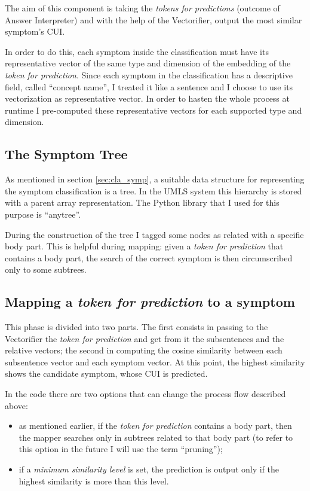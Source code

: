 The aim of this component is taking the \textit{tokens for predictions} (outcome of Answer Interpreter) and with the help of the Vectorifier, output the most similar symptom's CUI.

In order to do this, each symptom inside the classification must have its representative vector of the same type and dimension of the embedding of the \textit{token for prediction}. Since each symptom in the classification has a descriptive field, called ``concept name'', I treated it like a sentence and I choose to use its vectorization as representative vector. In order to hasten the whole process at runtime I pre-computed these representative vectors for each supported type and dimension.

\subsection{The Symptom Tree}
As mentioned in section \ref{sec:cla_symp}, a suitable data structure for representing the symptom classification is a tree. In the UMLS system this hierarchy is stored with a parent array representation. The Python library that I used for this purpose is ``anytree''.

During the construction of the tree I tagged some nodes as related with a specific body part. This is helpful during mapping: given a \textit{token for prediction} that contains a body part, the search of the correct symptom is then circumscribed only to some subtrees.

\subsection{Mapping a \textit{token for prediction} to a symptom}
This phase is divided into two parts. The first consists in passing to the Vectorifier the \textit{token for prediction} and get from it the subsentences and the relative vectors; the second in computing the cosine similarity between each subsentence vector and each symptom vector. At this point, the highest similarity shows the candidate symptom, whose CUI is predicted.

In the code there are two options that can change the process flow described above:
\begin{itemize}
  \item as mentioned earlier, if the \textit{token for prediction} contains a body part, then the mapper searches only in subtrees related to that body part (to refer to this option in the future I will use the term ``pruning'');
  \item if a \textit{minimum similarity level} is set, the prediction is output only if the highest similarity is more than this level. 
\end{itemize}

